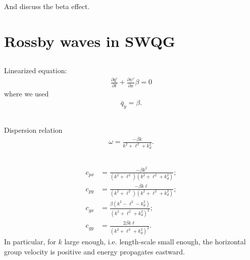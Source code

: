\documentclass[11pt,letterpaper]{book}
\theoremstyle{definition}
\newcommand{\pe}{\partial}
\begin{document}
And discuss the beta effect.

\section{Rossby waves in SWQG}
\subsection{}
Linearized equation:
\begin{align*}
    \frac{\pe q'}{\pe t}+\frac{\pe\psi'}{\pe x}\beta = 0
\end{align*}
where we used
\begin{align*}
    \overline{q}_y = \beta.
\end{align*}

\subsection{}
Dispersion relation
\begin{align*}
    \omega = \frac{-\beta k}{k^2+\ell^2+k_d^2}.
\end{align*}

\subsection{}
\begin{align*}
    c_{px} &= \frac{-\beta k^2}{(k^2+\ell^2)(k^2+\ell^2+k_d^2)};\\
    c_{py} &= \frac{-\beta k\ell}{(k^2+\ell^2)(k^2+\ell^2+k_d^2)};\\
    c_{gx} &= \frac{\beta (k^2-\ell^2-k_d^2)}{(k^2+\ell^2+k_d^2)^2};\\
    c_{gy} &= \frac{2\beta k\ell}{(k^2+\ell^2+k_d^2)^2}.
\end{align*}
In particular, for $k$ large enough, i.e. length-scale small enough, the horizontal group velocity is positive and energy propagates eastward.
\end{document}
